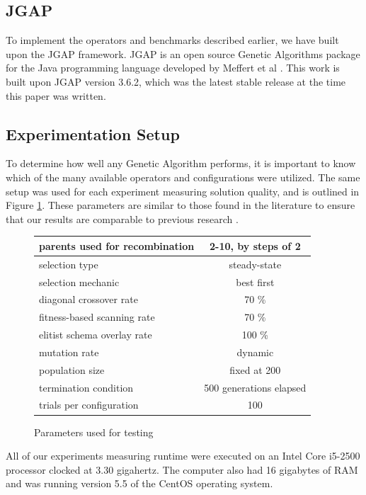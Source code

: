 \subsection*{JGAP}
To implement the operators and benchmarks described earlier, we have built upon the JGAP framework. JGAP is an open source Genetic Algorithms package for the Java programming language developed by Meffert et al \cite{jgap}. This work is built upon JGAP version 3.6.2, which was the latest stable release at the time this paper was written.

\subsection*{Experimentation Setup}

To determine how well any Genetic Algorithm performs, it is important to know which of the many available operators and configurations were utilized. The same setup was used for each experiment measuring solution quality, and is outlined in Figure \ref{fig:GA-config}. These parameters are similar to those found in the literature to ensure that our results are comparable to previous research \cite{Sudholt12, Eiben95, Eiben96}. 

\begin{figure}[h]
\begin{center}
\begin{tabular}{ | l | c | }
\hline
parents used for recombination & 2-10, by steps of 2 \\
\hline
selection type & steady-state \\
\hline
selection mechanic & best first \\
\hline
diagonal crossover rate & 70 \% \\
\hline
fitness-based scanning rate & 70 \% \\
\hline
elitist schema overlay rate & 100 \% \\
\hline
mutation rate & dynamic \cite{Back93} \\
\hline
population size & fixed at 200 \\
\hline
termination condition & 500 generations elapsed \\
\hline
trials per configuration & 100 \\
\hline
\end{tabular}
\caption{Parameters used for testing}
\label{fig:GA-config}
\end{center}
\end{figure}

All of our experiments measuring runtime were executed on an Intel Core i5-2500 processor clocked at 3.30 gigahertz. The computer also had 16 gigabytes of RAM and was running version 5.5 of the CentOS operating system. 

